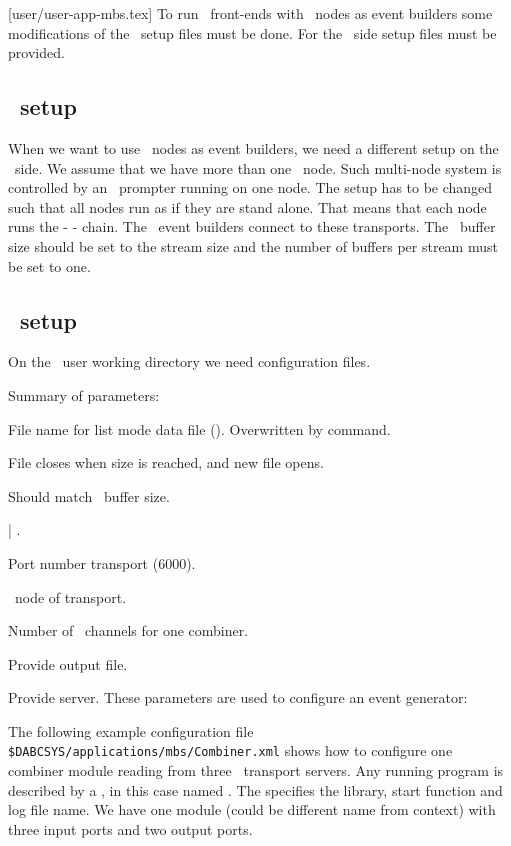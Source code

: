 [user/user-app-mbs.tex]
\label{user-app-mbs-chapter}
To run \mbs\ front-ends with \dabc\ nodes as event builders some
modifications of the \mbs\ setup files must be done.
For the \dabc\ side setup files must be provided.
\subsection[MBS setup]{\mbs\ setup}
When we want to use \dabc\ nodes as event builders, we need a different
setup on the \mbs\ side. We assume that we have more than one
\mbs\ node. Such multi-node system is controlled by an \mbs\ prompter running on one node.
The setup has to be changed such that all nodes run as if they are stand alone.
That means that each node runs the  -  - 
chain. The \dabc\ event builders connect to these transports.
The \mbs\ buffer size should be set to the stream size and the number of buffers per
stream must be set to one.

\subsection[DABC setup]{\dabc\ setup}
On the \dabc\ user working directory we need configuration files.

Summary of parameters:
\bdes
\item[MbsFileName] File name for list mode data file (). Overwritten by command.
\item[MbsFileSizeLimit] File closes when size is reached, and new file opens.
\item[BufferSize] Should match \mbs\ buffer size.
\item[MbsServerKind]  | .
\item[MbsServerPort] Port number transport (6000).
\item[MbsServerName] \mbs\ node of transport.
\item[NumInputs] Number of \mbs\ channels for one combiner.
\item[DoFile] Provide output file.
\item[DoServer] Provide server.
\edes
These parameters are used to configure an event generator:
\bdes
\item[NumSubevents]
\item[FirstProcId]
\item[SubeventSize]
\item[Go4Random]
\edes
{}
The following example configuration file {\tt \$DABCSYS/applications/mbs/Combiner.xml} shows how to 
configure one combiner module reading from three \mbs\ transport servers.
Any running program is described by a , in this case
named . The  specifies the
library, start function and log file name.
We have one module  (could be different name from context) 
with three input ports and two output ports.

